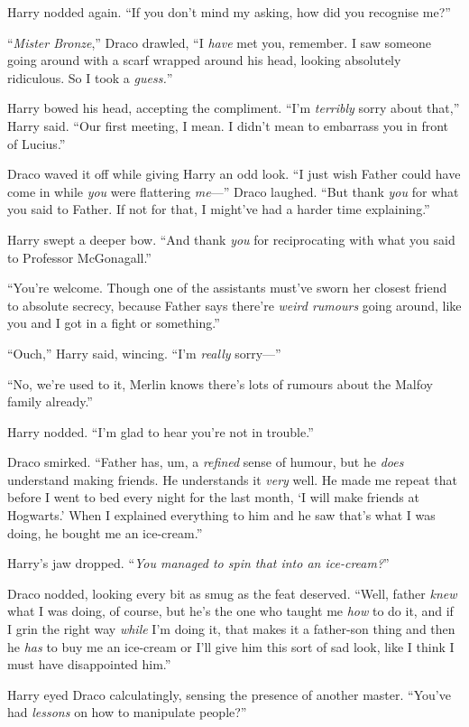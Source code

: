 Harry nodded again. “If you don’t mind my asking, how did you recognise me?”

“\emph{Mister Bronze},” Draco drawled, “I \emph{have} met you, remember. I saw someone going around with a scarf wrapped around his head, looking absolutely ridiculous. So I took a \emph{guess.}”

Harry bowed his head, accepting the compliment. “I’m \emph{terribly} sorry about that,” Harry said. “Our first meeting, I mean. I didn’t mean to embarrass you in front of Lucius.”

Draco waved it off while giving Harry an odd look. “I just wish Father could have come in while \emph{you} were flattering \emph{me}—” Draco laughed. “But thank \emph{you} for what you said to Father. If not for that, I might’ve had a harder time explaining.”

Harry swept a deeper bow. “And thank \emph{you} for reciprocating with what you said to Professor McGonagall.”

“You’re welcome. Though one of the assistants must’ve sworn her closest friend to absolute secrecy, because Father says there’re \emph{weird rumours} going around, like you and I got in a fight or something.”

“Ouch,” Harry said, wincing. “I’m \emph{really} sorry—”

“No, we’re used to it, Merlin knows there’s lots of rumours about the Malfoy family already.”

Harry nodded. “I’m glad to hear you’re not in trouble.”

Draco smirked. “Father has, um, a \emph{refined} sense of humour, but he \emph{does} understand making friends. He understands it \emph{very} well. He made me repeat that before I went to bed every night for the last month, ‘I will make friends at Hogwarts.’ When I explained everything to him and he saw that’s what I was doing, he bought me an ice-cream.”

Harry’s jaw dropped. “\emph{You managed to spin that into an ice-cream?}”

Draco nodded, looking every bit as smug as the feat deserved. “Well, father \emph{knew} what I was doing, of course, but he’s the one who taught me \emph{how} to do it, and if I grin the right way \emph{while} I’m doing it, that makes it a father-son thing and then he \emph{has} to buy me an ice-cream or I’ll give him this sort of sad look, like I think I must have disappointed him.”

Harry eyed Draco calculatingly, sensing the presence of another master. “You’ve had \emph{lessons} on how to manipulate people?”


